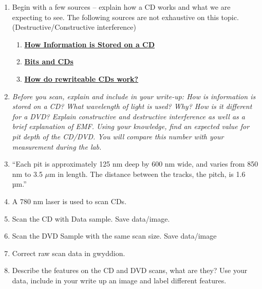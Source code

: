 \documentclass{../lab}
\begin{document}
\begin{enumerate}
    \item Begin with a few sources -- explain how a CD works and what we are expecting to see. The following sources are not exhaustive on this topic. (Destructive/Constructive interference)

    \begin{enumerate}

        \item \href{http://experimentationlab.berkeley.edu/sites/default/files/How\%20Information\%20is\%20Stored\%20on\%20a\%20CD.mp4}{\textbf{How Information is Stored on a CD}}

        \item \href{http://experimentationlab.berkeley.edu/sites/default/files/Bits_and_CDs.pdf}{\textbf{Bits and CDs}}

        \item \href{http://experimentationlab.berkeley.edu/sites/default/files/How_do_Rewriteable_CDs_work.pdf}{\textbf{How do rewriteable CDs work?}}

    \end{enumerate}

    \item \emph{Before you scan, explain and include in your write-up: How is information is stored on a CD? What wavelength of light is used? Why? How is it different for a DVD? Explain constructive and destructive interference as well as a brief explanation of EMF. Using your knowledge, find an expected value for pit depth of the CD/DVD. You will compare this number with your measurement during the lab. }

    \item ``Each pit is approximately 125 nm deep by 600 nm wide, and varies from 850 nm to 3.5 $\mu$m in length. The distance between the tracks, the pitch, is 1.6 µm.''

    \item A 780 nm laser is used to scan CDs.

    \item Scan the CD with Data sample. Save data/image.

    \item Scan the DVD Sample with the same scan size.  Save data/image

    \item Correct raw scan data in gwyddion.

    \item Describe the features on the CD and DVD scans, what are they? Use your data, include in your write up an image and label different features.


\end{enumerate}
\end{document}
